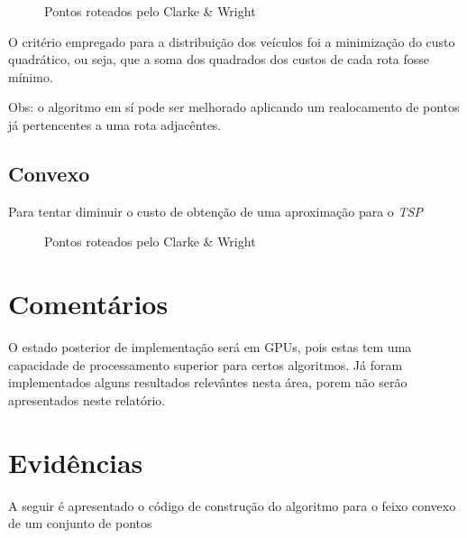 \documentclass[a4paper, 12pt]{article}
\begin{document}
\begin{figure}[!ht]
\centering
{}
\caption{Pontos roteados pelo Clarke \& Wright}
\label{roteado}
\end{figure}


	O critério empregado para a distribuição dos veículos foi a minimização do
custo quadrático, ou seja, que a soma dos quadrados dos custos de cada rota
fosse mínimo. 

Obs: o algoritmo em sí pode ser melhorado aplicando um realocamento de pontos já
pertencentes a uma rota adjacêntes.


\subsection{Convexo}

	Para tentar diminuir o custo de obtenção de uma aproximação para o
\emph{TSP}

\begin{figure}[!ht]
\centering
{}
\caption{Pontos roteados pelo Clarke \& Wright}
\label{roteado}
\end{figure}

\section{Comentários}

	O estado posterior de implementação será em GPUs, pois estas tem uma
capacidade de processamento superior para certos algoritmos. Já foram
implementados alguns resultados relevântes nesta área, porem não serão
apresentados neste relatório.


\section{Evidências}

	A seguir é apresentado o código de construção do algoritmo para o feixo
convexo de um conjunto de pontos 


{\small

}
\end{document}
